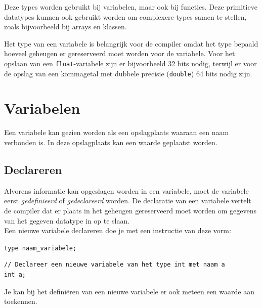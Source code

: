 \documentclass[11pt,fleqn]{book} %
\begin{document}


\noindent Deze types worden gebruikt bij variabelen, maar ook bij functies. Deze primitieve datatypes kunnen ook gebruikt worden om complexere types samen te stellen, zoals bijvoorbeeld bij arrays en klassen.

\begin{remark}
	Het type van een variabele is belangrijk voor de compiler omdat het type bepaald hoeveel geheugen er gereserveerd moet worden voor de variabele. Voor het opslaan van een \texttt{float}-variabele zijn er bijvoorbeeld 32 bits nodig, terwijl er voor de opslag van een kommagetal met dubbele precisie (\texttt{double}) 64 bits nodig zijn.
\end{remark}

\section{Variabelen}
Een variabele kan gezien worden als een opslagplaats waaraan een naam verbonden is. In deze opslagplaats kan een waarde geplaatst worden.
\subsection{Declareren}
Alvorens informatie kan opgeslagen worden in een variabele, moet de variabele eerst \emph{gedefinieerd} of \emph{gedeclareerd} worden. De declaratie van een variabele vertelt de compiler dat er plaats in het geheugen gereserveerd moet worden om gegevens van het gegeven datatype in op te slaan.\\

\noindent Een nieuwe variabele declareren doe je met een instructie van deze vorm: 
\begin{center}
	\texttt{type naam\_variabele;}
\end{center}

\begin{example}
	\phantom{ }
	\begin{verbatim}
// Declareer een nieuwe variabele van het type int met naam a
int a;
	\end{verbatim}
\end{example}

\noindent Je kan bij het definiëren van een nieuwe variabele er ook meteen een waarde aan toekennen.
\end{document}
